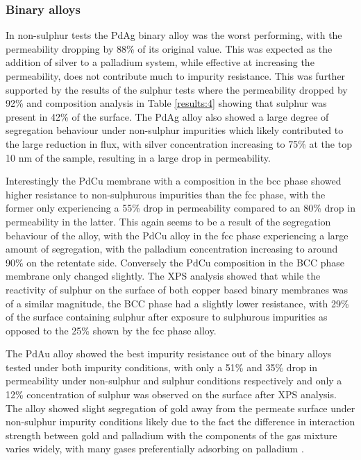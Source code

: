 \subsubsection{Binary alloys}
In non-sulphur tests the PdAg binary alloy was the worst performing, with the permeability dropping by 88\% of its original value. This was expected as the addition of silver to a palladium system, while effective at increasing the permeability, does not contribute much to impurity resistance. \cite{Peters2016b} This was further supported by the results of the sulphur tests where the permeability dropped by 92\% and composition analysis in Table \ref{results:4} showing that sulphur was present in 42\% of the surface. The PdAg alloy also showed a large degree of segregation behaviour under non-sulphur impurities which likely contributed to the large reduction in flux, with silver concentration increasing to 75\% at the top 10 nm of the sample, resulting in a large drop in permeability. 

Interestingly the PdCu membrane with a composition in the bcc phase showed higher resistance to non-sulphurous impurities than the fcc phase, with the former only experiencing a 55\% drop in permeability compared to an 80\% drop in permeability in the latter. This again seems to be a result of the segregation behaviour of the alloy, with the PdCu alloy in the fcc phase experiencing a large amount of segregation, with the palladium concentration increasing to around 90\% on the retentate side. Conversely the PdCu composition in the BCC phase membrane only changed slightly. The XPS analysis showed that while the reactivity of sulphur on the surface of both copper based binary membranes was of a similar magnitude, the BCC phase had a slightly lower resistance, with 29\% of the surface containing sulphur after exposure to sulphurous impurities as opposed to the 25\% shown by the fcc phase alloy.

The PdAu alloy showed the best impurity resistance out of the binary alloys tested under both impurity conditions, with only a 51\% and 35\% drop in permeability under non-sulphur and sulphur conditions respectively and only a 12\% concentration of sulphur was observed on the surface after XPS analysis. The alloy showed slight segregation of gold away from the permeate surface under non-sulphur impurity conditions likely due to the fact the difference in interaction strength between gold and palladium with the components of the gas mixture varies widely, with many gases preferentially adsorbing on palladium \cite{Gade2011}.

